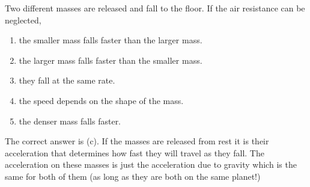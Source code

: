 
\begin{problem}[Robin3]
{Two different masses are released and fall to the floor. If the air resistance can be neglected,
\begin{enumerate}
	\item the smaller mass falls faster than the larger mass.
	\item the larger mass falls faster than the smaller mass. 
	\item they fall at the same rate. \answer
	\item the speed depends on the shape of the mass.
	\item the denser mass falls faster.
\end{enumerate}
}
{}
{The correct answer is (c).    If the masses are released from rest it is their acceleration that determines how fast they will travel as they fall.  The acceleration on these masses is just the acceleration due to gravity which is the same for both of them (as long as they are both on the same planet!) }
\end{problem}